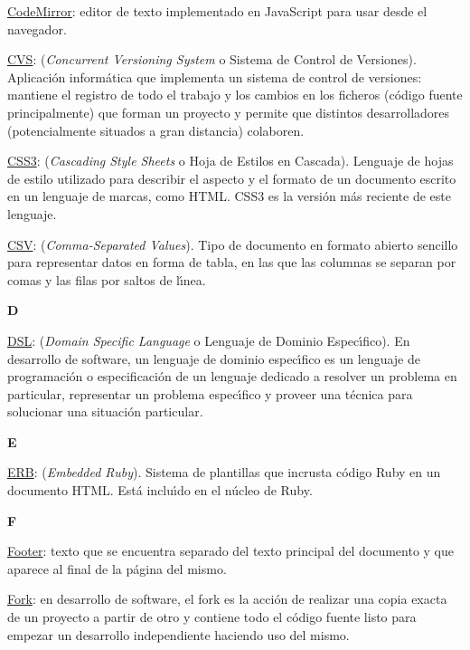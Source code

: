 \href{http://codemirror.net/}{\underline{CodeMirror}}: editor de texto implementado en JavaScript para usar desde el navegador.
\bigskip

\underline{CVS}: (\textit{Concurrent Versioning System} o Sistema de Control de Versiones). Aplicaci\'on inform\'atica que implementa un sistema de control de versiones: 
mantiene el registro de todo el trabajo y los cambios en los ficheros (c\'odigo fuente principalmente) que forman un proyecto y permite que distintos desarrolladores 
(potencialmente situados a gran distancia) colaboren.
\bigskip

\underline{CSS3}: (\textit{Cascading Style Sheets} o Hoja de Estilos en Cascada). Lenguaje de hojas de estilo utilizado para describir el aspecto y el formato de un documento 
escrito en un lenguaje de marcas, como HTML. CSS3 es la versi\'on m\'as reciente de este lenguaje.
\bigskip

\underline{CSV}: (\textit{Comma-Separated Values}). Tipo de documento en formato abierto sencillo para representar datos en forma de tabla, en las que las columnas se separan 
por comas y las filas por saltos de l\'{\i}nea. 
\bigskip

\bigskip
{\bfseries {\Huge D}}\label{Apendice1:D}
\bigskip
\bigskip

\underline{DSL}: (\textit{Domain Specific Language} o Lenguaje de Dominio Espec\'{\i}fico). En desarrollo de software, un lenguaje de dominio espec\'{\i}fico es 
un lenguaje de programaci\'on o especificaci\'on de un lenguaje dedicado a resolver un problema en particular, representar un problema espec\'{\i}fico 
y proveer una t\'ecnica para solucionar una situaci\'on particular. 
\newpage

\bigskip
{\bfseries {\Huge E}}\label{Apendice1:E}
\bigskip
\bigskip

\underline{ERB}: (\textit{Embedded Ruby}). Sistema de plantillas que incrusta c\'odigo Ruby en un documento HTML. Est\'a inclu\'{\i}do en el n\'ucleo de Ruby.
\bigskip

\bigskip
{\bfseries {\Huge F}}\label{Apendice1:F}
\bigskip
\bigskip

\underline{Footer}: texto que se encuentra separado del texto principal del documento y que aparece al final de la p\'agina del mismo.
\bigskip

\underline{Fork}: en desarrollo de software, el fork es la acci\'on de realizar una copia exacta de un proyecto a partir de otro y contiene todo el c\'odigo fuente listo para
empezar un desarrollo independiente haciendo uso del mismo.
\bigskip

